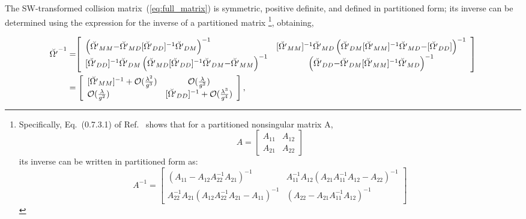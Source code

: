 \documentclass[
prb,
twocolumn,
superscriptaddress,
 amsmath,amssymb,
 aps,
longbibliography,
]{revtex4-2}
\begin{document}
The SW-transformed collision matrix~(\ref{eq:full_matrix}) is symmetric, positive definite, and defined in partitioned form; its inverse can be determined using the expression for the inverse of a partitioned matrix \cite{hornTopicsMatrixAnalysis1991}
\footnote{
Specifically, Eq.~(0.7.3.1) of Ref.~\cite{hornTopicsMatrixAnalysis1991} shows that for a partitioned nonsingular matrix A,
\begin{equation}A=\left[\begin{array}{ll}
A_{11} & A_{12} \\
A_{21} & A_{22}
\end{array}\right]
\end{equation}
its inverse can be written in partitioned form as:
  {\tiny
\begin{equation}
A^{-1}{=}\left[\begin{array}{lc}
\left(A_{11}-A_{12} A_{22}^{-1} A_{21}\right)^{-1} & A_{11}^{-1} A_{12}\left(A_{21} A_{11}^{-1} A_{12}-A_{22}\right)^{-1} \\
A_{22}^{-1} A_{21}\left(A_{12} A_{22}^{-1} A_{21}-A_{11}\right)^{-1} & \left(A_{22}-A_{21} A_{11}^{-1} A_{12}\right)^{-1}
\end{array}\right]
\end{equation}}},
obtaining,
\begin{widetext}
\begin{equation}
	\begin{split}
\breve{\Omega'}^{-1}&=\!\!\left[\begin{array}{lc}
\left(\breve{\Omega'}_{MM}{-}\breve{\Omega'}_{MD} [\breve{\Omega'}_{DD}]^{{-}1} \breve{\Omega'}_{DM}\right)^{{-}1} & [\breve{\Omega'}_{MM}]^{{-}1} \breve{\Omega'}_{MD}\left(\breve{\Omega'}_{DM} [\breve{\Omega'}_{MM}]^{{-}1} \breve{\Omega'}_{MD}{-}[\breve{\Omega'}_{DD}]\right)^{{-}1} \\
{[\breve{\Omega'}_{DD}]^{{-}1} }\breve{\Omega'}_{DM}\left(\breve{\Omega'}_{MD}[\breve{\Omega'}_{DD}]^{{-}1} \breve{\Omega'}_{DM}{-}\breve{\Omega'}_{MM}\right)^{{-}1} & \left(\breve{\Omega'}_{DD}{-}\breve{\Omega'}_{DM} [\breve{\Omega'}_{MM}]^{{-}1} \breve{\Omega'}_{MD}\right)^{{-}1}
\end{array}\right]\\
&=\left[\begin{array}{lc}
  [\breve{\Omega'}_{MM}]^{-1}
+\mathcal{O}(\frac{\lambda^2}{g^3}) & \mathcal{O}(\frac{\lambda}{g^2})\\
\mathcal{O}(\frac{\lambda}{g^2}) & {[\breve{\Omega'}_{DD}]^{{-}1}}+\mathcal{O}(\frac{\lambda^3}{g^4})
\end{array}\right],
\end{split}
\raisetag{5mm}
\end{equation}
\end{widetext}
\end{document}

